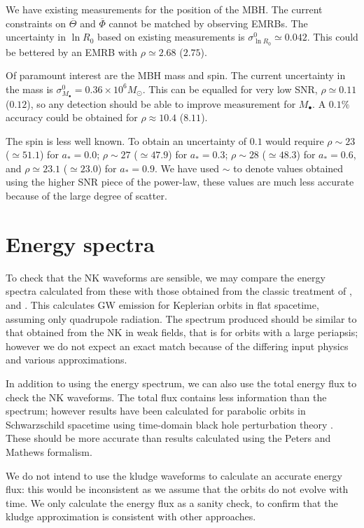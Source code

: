 \documentclass[useAMS,usedcolumn,usegraphicx,usenatbib]{mn2e}
\begin{document}
We have existing measurements for the position of the MBH. The current constraints on $\overline{\Theta}$ and $\overline{\Phi}$ cannot be matched by observing EMRBs. The uncertainty in $\ln R_0$ based on existing measurements is $\sigma_{\ln R_0}^0\simeq 0.042$. This could be bettered by an EMRB with $\rho \simeq 2.68$ ($2.75$).

Of paramount interest are the MBH mass and spin. The current uncertainty in the mass is $\sigma_{M_\bullet}^0 = 0.36 \times 10^6 M_\odot$. This can be equalled for very low SNR, $\rho \simeq 0.11$ ($0.12$), so any detection should be able to improve measurement for $M_\bullet$. A $0.1\%$ accuracy could be obtained for $\rho \approx 10.4$ ($8.11$).

The spin is less well known. To obtain an uncertainty of $0.1$ would require $\rho \sim 23$ ($\simeq 51.1$) for $a_\ast = 0.0$; $\rho \sim 27$ ($\simeq 47.9$) for $a_\ast = 0.3$; $\rho \sim 28$ ($\simeq 48.3$) for $a_\ast = 0.6$, and $\rho \simeq 23.1$ ($\simeq 23.0$) for $a_\ast = 0.9$. We have used $\sim$ to denote values obtained using the higher SNR piece of the power-law, these values are much less accurate because of the large degree of scatter.

\section{Energy spectra}\label{sec:Energy}

To check that the NK waveforms are sensible, we may compare the energy spectra calculated from these with those obtained from the classic treatment of \citet{Peters1963}, and \citet{Peters1964}. This calculates GW emission for Keplerian orbits in flat spacetime, assuming only quadrupole radiation. The spectrum produced should be similar to that obtained from the NK in weak fields, that is for orbits with a large periapsis; however we do not expect an exact match because of the differing input physics and various approximations.

In addition to using the energy spectrum, we can also use the total energy flux to check the NK waveforms. The total flux contains less information than the spectrum; however results have been calculated for parabolic orbits in Schwarzschild spacetime using time-domain black hole perturbation theory \citep{Martel2004}. These should be more accurate than results calculated using the Peters and Mathews formalism.

We do not intend to use the kludge waveforms to calculate an accurate energy flux: this would be inconsistent as we assume that the orbits do not evolve with time. We only calculate the energy flux as a sanity check, to confirm that the kludge approximation is consistent with other approaches.
\end{document}
